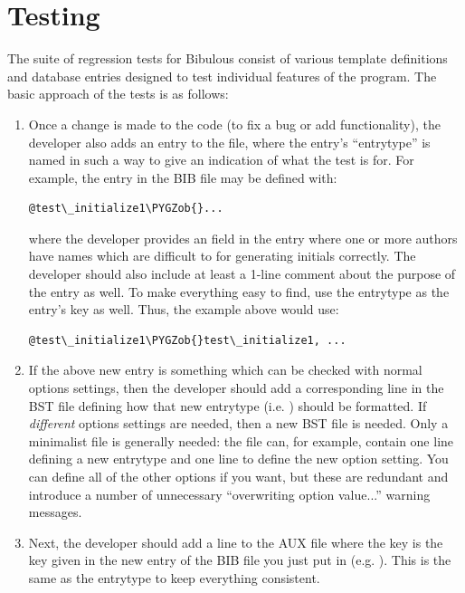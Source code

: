 \documentclass[letterpaper,10pt,english]{sphinxmanual}
\def\PYGZob{\char`\{}
\begin{document}
\section{Testing}
\label{developer_guide:testing}
The suite of regression tests for Bibulous consist of various template definitions and database entries designed to test individual features of the program. The basic approach of the tests is as follows:
\begin{enumerate}
\item {} 
Once a change is made to the code (to fix a bug or add functionality), the developer also adds an entry to the  file, where the entry's ``entrytype'' is named in such a way to give an indication of what the test is for. For example, the entry in the BIB file may be defined with:

\begin{Verbatim}[commandchars=\\\{\}]
@test\_initialize1\PYGZob{}...
\end{Verbatim}

where the developer provides an  field in the entry where one or more authors have names which are difficult to for generating initials correctly. The developer should also include at least a 1-line comment about the purpose of the entry as well. To make everything easy to find, use the entrytype as the entry's key as well. Thus, the example above would use:

\begin{Verbatim}[commandchars=\\\{\}]
@test\_initialize1\PYGZob{}test\_initialize1, ...
\end{Verbatim}

\item {} 
If the above new entry is something which can be checked with normal options settings, then the developer should add a corresponding line in the BST file defining how that new entrytype (i.e. ) should be formatted. If \emph{different} options settings are needed, then a new BST file is needed. Only a minimalist file is generally needed: the file can, for example, contain one line defining a new entrytype and one line to define the new option setting. You can define all of the other options if you want, but these are redundant and introduce a number of unnecessary ``overwriting option value...'' warning messages.

\item {} 
Next, the developer should add a line  to the AUX file where the key is the key given in the new entry of the BIB file you just put in (e.g. ). This is the same as the entrytype to keep everything consistent.


\end{enumerate}
\end{document}
